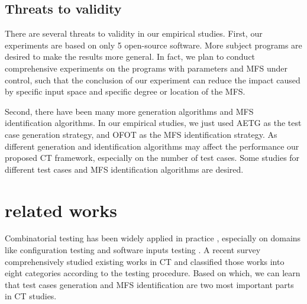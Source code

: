 \documentclass{sig-alternate}
\begin{document}
\subsection{Threats to validity}

There are several threats to validity in our empirical studies. First, our experiments are based on only 5 open-source software. More subject programs are desired to make the results more general. In fact, we plan to conduct comprehensive experiments on the programs with parameters and MFS under control, such that the conclusion of our experiment can reduce the impact caused by specific input space and specific degree or location of the MFS.

Second, there have been many more generation algorithms and MFS identification algorithms. In our empirical studies, we just used AETG \cite{cohen1997aetg} as the test case generation strategy, and OFOT \cite{nie2011minimal} as the MFS identification strategy. As different generation and identification algorithms may affect the performance our proposed CT framework, especially on the number of test cases.
Some studies for different test cases and MFS identification algorithms are desired.



\section{related works}
Combinatorial testing has been widely applied in practice \cite{kuhn2010practical}, especially on domains like configuration testing \cite{yilmaz2006covering,cohen2006testing,qu2008configuration,fouche2009incremental} and software inputs testing \cite{cohen1997aetg,borazjany2012combinatorial,ghandehari2013applying,garn2014eris}. A recent survey \cite{nie2011survey} comprehensively studied existing works in CT and classified those works into eight categories according to the testing procedure. Based on which, we can learn that test cases generation and MFS identification are two most important parts in CT studies.
\end{document}
